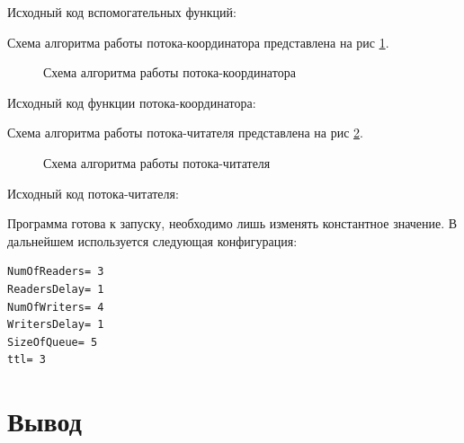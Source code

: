 \documentclass[a4paper]{article}
\begin{document}
Исходный код вспомогательных функций:
	
	
	Схема алгоритма работы потока-координатора представлена на рис \ref{img:thr_coord}.
	\begin{figure}[h!]
		\caption{Схема алгоритма работы потока-координатора}
		\label{img:thr_coord}
	\end{figure}
	
	Исходный код функции потока-координатора:
	

	Схема алгоритма работы потока-читателя представлена на рис \ref{img:thr_reader}.
	\begin{figure}[h!]
		\caption{Схема алгоритма работы потока-читателя}
		\label{img:thr_reader}
	\end{figure}
	Исходный код потока-читателя:
	
	Программа готова к запуску, необходимо лишь изменять константное значение.
	В дальнейшем используется следующая конфигурация:
	\begin{lstlisting}[style=crs_cpp]
NumOfReaders= 3 
ReadersDelay= 1 
NumOfWriters= 4 
WritersDelay= 1 
SizeOfQueue= 5 
ttl= 3
	\end{lstlisting}



\section{Вывод}
	
	
\end{document}
